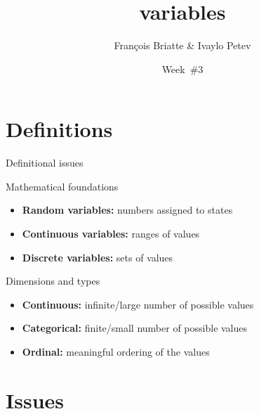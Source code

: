\documentclass[t]{beamer}
\title{variables}
\author{François Briatte \& Ivaylo Petev}
\date{Week~\#3}
\begin{document}

	\section{Definitions}
	
	\begin{frame}[t]{Definitional issues}
	
     \begin{block}{Mathematical foundations}

        \begin{itemize}
  				\item \textbf{Random variables:} numbers assigned to states
          \item \textbf{Continuous variables:} ranges of values
      		\item \textbf{Discrete variables:} sets of values
        \end{itemize}
     
     \end{block}     	

	   \begin{block}{Dimensions and types}
	     
	     \begin{itemize}
		     \item \textbf{Continuous:} infinite/large number of possible values
		     \item \textbf{Categorical:} finite/small number of possible values
		     \item \textbf{Ordinal:} meaningful ordering of the values
	     \end{itemize}

	   \end{block}

	\end{frame}
	
	\section{Issues}
	
\end{document}
